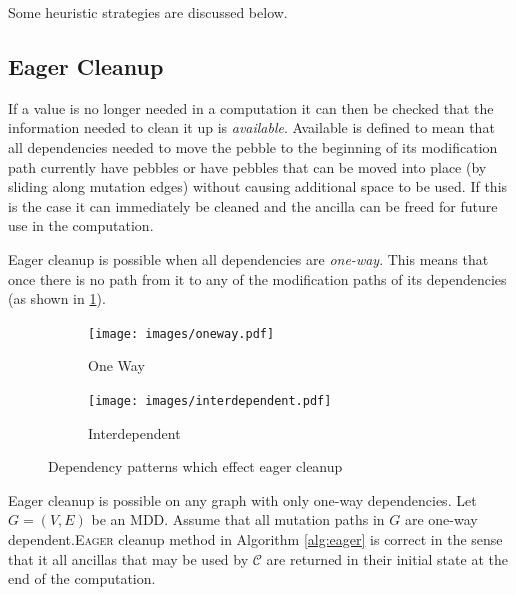 Some heuristic strategies are discussed below.

\subsection{Eager Cleanup}

If a value is no longer needed in a computation it can then be checked that the
information needed to clean it up is \emph{available}. Available is defined to
mean that all dependencies needed to move the pebble to the beginning of its
modification path currently have pebbles or have pebbles that can be moved into
place (by sliding along mutation edges) without causing additional space to be
used. If this is the case it can immediately be cleaned and the ancilla can be
freed for future use in the computation.

Eager cleanup is possible when all dependencies are \emph{one-way}.
This means that once there is no path from it to any of the modification paths
of its dependencies (as shown in \cref{fig:one-way}).

\begin{figure}
  \centering
  \begin{subfigure}[b]{0.3\textwidth}
    \texttt{[image: images/oneway.pdf]}
    \caption{One Way}
    \label{fig:one-way}
  \end{subfigure}
  \qquad
  \begin{subfigure}[b]{0.3\textwidth}
    \texttt{[image: images/interdependent.pdf]}
    \caption{Interdependent}
    \label{fig:interdep}
  \end{subfigure}
  \caption{Dependency patterns which effect eager cleanup}
\end{figure}


\begin{theorem}

Eager cleanup is possible on any graph with only one-way dependencies.  Let
$G=(V,E)$ be an MDD.  Assume that all mutation paths in $G$ are one-way
dependent.\textsc{Eager} cleanup method in Algorithm
\ref{alg:eager} is correct in the sense that it all
ancillas that may be used by ${\mathcal C}$ are returned in their initial state
at the end of the computation.

\end{theorem}

